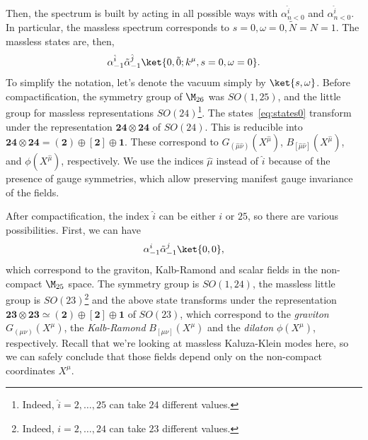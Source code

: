 Then, the spectrum is built by acting in all possible ways with $\alpha^{\hat{i}}_{n<0}$ and $\alpha^{\hat{i}}_{n<0}$. In particular, the massless spectrum corresponds to $s=0, \omega = 0, \tilde{N}=N=1$. The massless states are, then, 
\begin{equation}\label{eq:states0}
    \alpha^{\hat{i}}_{-1} \tilde{\alpha}^{\hat{j}}_{-1} \ket{0,\tilde{0}; k^\mu, s = 0, \omega = 0} .
\end{equation}
To simplify the notation, let's denote the vacuum simply by $\ket{s,\omega}$. Before compactification, the symmetry group of $\M_{26}$ was $SO(1,25)$, and the little group for massless representations $SO(24)$\footnote{Indeed, $\hat{i} = 2, \dots, 25$ can take $24$ different values.}. The states~\eqref{eq:states0} transform under the representation $\boldsymbol{24} \otimes \boldsymbol{24}$ of $SO(24)$. This is reducible into $\boldsymbol{24} \otimes \boldsymbol{24} = (\boldsymbol{2}) \oplus [\boldsymbol{2}] \oplus \boldsymbol{1}$. These correspond to $G_{(\hat{\mu}\hat{\nu})}(X^{\hat{\mu}})$, $B_{[\hat{\mu}\hat{\nu}]}(X^{\hat{\mu}})$, and $\phi(X^{\hat{\mu}})$, respectively. We use the indices $\hat{\mu}$ instead of $\hat{i}$ because of the presence of gauge symmetries, which allow preserving manifest gauge invariance of the fields.

After compactification, the index $\hat{i}$ can be either $i$ or $25$, so there are various possibilities. First, we can have
\begin{equation}\label{eq:eq:comp-vectors}
    \alpha^{i}_{-1} \tilde{\alpha}^{j}_{-1} \ket{0,0},
\end{equation}
which correspond to the graviton, Kalb-Ramond and scalar fields in the non-compact $\M_{25}$ space. The symmetry group is $SO(1,24)$, the massless little group is $SO(23)$\footnote{Indeed, ${i} = 2, \dots, 24$ can take $23$ different values.} and the above state transforms under the representation $\boldsymbol{23} \otimes \boldsymbol{23} \simeq (\boldsymbol{2}) \oplus [\boldsymbol{2}] \oplus \boldsymbol{1}$ of $SO(23)$, which correspond to the \emph{graviton} $G_{(\mu\nu)}(X^\mu)$, the \emph{Kalb-Ramond} $B_{[\mu\nu]}(X^\mu)$ and the \emph{dilaton} $\phi(X^\mu)$, respectively. Recall that we're looking at massless Kaluza-Klein modes here, so we can safely conclude that those fields depend only on the non-compact coordinates $X^\mu$.

